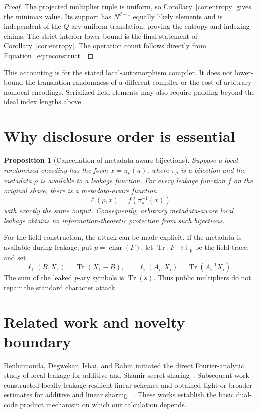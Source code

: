 \documentclass[11pt]{article}
\newtheorem{proposition}[theorem]{Proposition}
\theoremstyle{definition}
\newcommand{\F}{\mathbb{F}}
\begin{document}
\begin{proof}
The projected multiplier tuple is uniform, so Corollary~\ref{cor:entropy} gives
the minimax value.  Its support has $N^{d-1}$ equally likely elements and is
independent of the $Q$-ary uniform translation, proving the entropy and indexing
claims.  The strict-interior lower bound is the final statement of
Corollary~\ref{cor:entropy}.  The operation count follows directly from
Equation~\eqref{eq:reconstruct}.
\end{proof}

This accounting is for the stated local-automorphism compiler.  It does not
lower-bound the translation randomness of a different compiler or the cost of
arbitrary nonlocal encodings.  Serialized field elements may also require
padding beyond the ideal index lengths above.

\section{Why disclosure order is essential}

\begin{proposition}[Cancellation of metadata-aware bijections]\label{prop:cancellation}
Suppose a local randomized encoding has the form $x=\pi_\rho(u)$, where
$\pi_\rho$ is a bijection and the metadata $\rho$ is available to a leakage
function.  For every leakage function $f$ on the original share, there is a
metadata-aware function
\[
  \ell(\rho,x)=f(\pi_\rho^{-1}(x))
\]
with exactly the same output.  Consequently, arbitrary metadata-aware local
leakage obtains no information-theoretic protection from such bijections.
\end{proposition}

For the field construction, the attack can be made explicit.  If the metadata is
available during leakage, put $p=\operatorname{char}(F)$, let
$\operatorname{Tr}:F\to\F_p$ be the field trace, and set
\[
 \ell_1(B,X_1)=\operatorname{Tr}(X_1-B),\qquad
 \ell_i(A_i,X_i)=\operatorname{Tr}(A_i^{-1}X_i).
\]
The sum of the leaked $p$-ary symbols is $\operatorname{Tr}(s)$.  Thus public
multipliers do not repair the standard character attack.

\section{Related work and novelty boundary}\label{sec:related}

Benhamouda, Degwekar, Ishai, and Rabin initiated the direct Fourier-analytic
study of local leakage for additive and Shamir secret sharing~\cite{bdir18}.
Subsequent work constructed locally leakage-resilient linear schemes and obtained
tight or broader estimates for additive and linear sharing
~\cite{mpsw21,maji22tight,maji22bounded}.  These works establish the basic
dual-code product mechanism on which our calculation depends.
\end{document}
